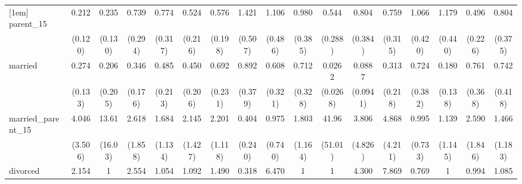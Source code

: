{\begin{tabular}{l*{16}{c}}
[1em]
parent\_15           &       0.212\sym{**} &       0.235\sym{**} &       0.739         &       0.774         &       0.524         &       0.576         &       1.421         &       1.106         &       0.980         &       0.544         &       0.804         &       0.759         &       1.066         &       1.179         &       0.496         &       0.804         \\
                    &     (0.120)         &     (0.130)         &     (0.294)         &     (0.317)         &     (0.216)         &     (0.198)         &     (0.507)         &     (0.486)         &     (0.385)         &     (0.288)         &     (0.384)         &     (0.315)         &     (0.420)         &     (0.440)         &     (0.226)         &     (0.375)         \\
[1em]
married             &       0.274\sym{**} &       0.206         &       0.346\sym{*}  &       0.485         &       0.450         &       0.692         &       0.892         &       0.608         &       0.712         &      0.0262\sym{***}&      0.0887\sym{*}  &       0.313         &       0.724         &       0.180\sym{*}  &       0.761         &       0.742         \\
                    &     (0.133)         &     (0.205)         &     (0.176)         &     (0.213)         &     (0.206)         &     (0.231)         &     (0.379)         &     (0.321)         &     (0.328)         &    (0.0268)         &    (0.0941)         &     (0.218)         &     (0.382)         &     (0.138)         &     (0.368)         &     (0.418)         \\
[1em]
married\_parent\_15   &       4.046         &       13.61\sym{*}  &       2.618         &       1.684         &       2.145         &       2.201         &       0.404         &       0.975         &       1.803         &       41.96\sym{**} &       3.806         &       4.868         &       0.995         &       1.139         &       2.590         &       1.466         \\
                    &     (3.506)         &     (16.03)         &     (1.858)         &     (1.134)         &     (1.427)         &     (1.118)         &     (0.240)         &     (0.740)         &     (1.164)         &     (51.01)         &     (4.826)         &     (4.211)         &     (0.733)         &     (1.145)         &     (1.846)         &     (1.183)         \\
[1em]
divorced            &       2.154         &           1         &       2.554         &       1.054         &       1.092         &       1.490         &       0.318         &       6.470\sym{***}&           1         &           1         &       4.300\sym{*}  &       7.869\sym{**} &       0.769         &           1         &       0.994         &       1.085         \\

\end{tabular}}

